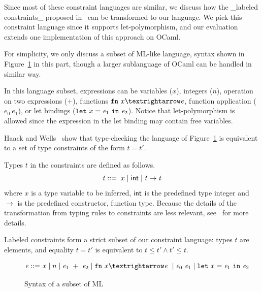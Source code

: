 Since most of these constraint languages are similar, we discuss how
the _labeled constraints_ proposed in~\cite{haack:slicing} can be
transformed to our language. We pick this constraint language since it
supports let-polymorphism, and our evaluation extends one
implementation of this approach on OCaml.

For simplicity, we only discuss a subset of ML-like language, syntax shown in
Figure~\ref{figure:mltypes} in this part, though a larger sublanguage
of OCaml can be handled in similar way.

\newcommand\expr{\mathit{e}}
\newcommand\ty{\mathit{t}}

In this language subset, expressions can be variables ($x$), integers
($n$), operation on two expressions ($+$), functions $\fn~x→\expr$,
function application ($\expr_0~\expr_1$), or let bindings
($\kwlet x = \expr_1 \kwin \expr_2$). Notice that
let-polymorphism is allowed since the expression in the let binding
may contain free variables.

Haack and Wells~\cite{haack:slicing} show that type-checking the
language of Figure~\ref{figure:mltypes} is equivalent to a set of
type constraints of the form $\ty = \ty'$.

Types $\ty$ in the constraints are defined as follows.
\[\ty ::=\; x \mid \atom{int} \mid \ty \rightarrow \ty\]
\noindent where $x$ is a type variable to be inferred, $\textsf{int}$ is the predefined type integer and
$\rightarrow$ is the predefined constructor, function type. Because
the details of the
transformation from typing rules to constraints
are less relevant, see~\cite{haack:slicing} for more details. 

Labeled constraints form a strict subset of our constraint
language:
types $\ty$ are elements, and equality $\ty=\ty'$ is equivalent to
$\ty\leq \ty' \land \ty'\leq \ty$. 

\begin{figure}
\begin{minipage}{2in}
\begin{align*}
\expr ::=  & x \mid n \mid \expr_1 + \expr_2 \mid \fn x → \expr \mid
\expr_0  \expr_1 \mid \kwlet x =
\expr_1  \kwin  \expr_2  \\
\end{align*}
\end{minipage}
\caption{Syntax of a subset of ML}
\label{figure:mltypes}
\end{figure}


